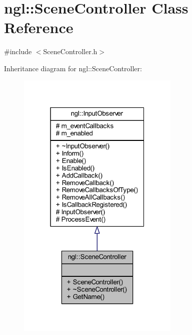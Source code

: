 \hypertarget{classngl_1_1_scene_controller}{}\section{ngl\+:\+:Scene\+Controller Class Reference}
\label{classngl_1_1_scene_controller}


{\ttfamily \#include $<$Scene\+Controller.\+h$>$}



Inheritance diagram for ngl\+:\+:Scene\+Controller\+:
\nopagebreak
\begin{figure}[H]
\begin{center}
\leavevmode
\includegraphics[width=220pt]{classngl_1_1_scene_controller__inherit__graph}
\end{center}
\end{figure}


